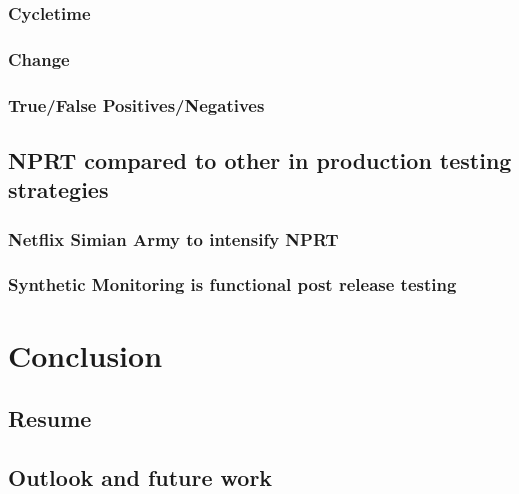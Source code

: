 \subsection{Cycletime}
\subsection{Change}
\subsection{True/False Positives/Negatives}
\section{NPRT compared to other in production testing strategies}
\subsection{Netflix Simian Army to intensify NPRT}
\subsection{Synthetic Monitoring is functional post release testing}

\chapter{Conclusion}
\section{Resume}
\section{Outlook and future work}




